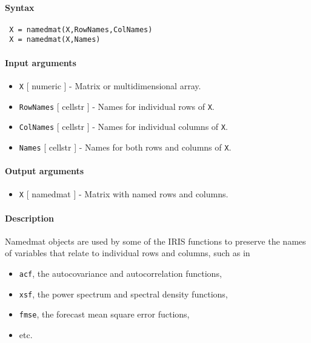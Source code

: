 


	\paragraph{Syntax}
 
 \begin{verbatim}
 X = namedmat(X,RowNames,ColNames)
 X = namedmat(X,Names)
 \end{verbatim}
 
 \paragraph{Input arguments}
 
 \begin{itemize}
 \item
   \texttt{X} {[} numeric {]} - Matrix or multidimensional array.
 \item
   \texttt{RowNames} {[} cellstr {]} - Names for individual rows of
   \texttt{X}.
 \item
   \texttt{ColNames} {[} cellstr {]} - Names for individual columns of
   \texttt{X}.
 \item
   \texttt{Names} {[} cellstr {]} - Names for both rows and columns of
   \texttt{X}.
 \end{itemize}
 
 \paragraph{Output arguments}
 
 \begin{itemize}
 \item
   \texttt{X} {[} namedmat {]} - Matrix with named rows and columns.
 \end{itemize}
 
 \paragraph{Description}
 
 Namedmat objects are used by some of the IRIS functions to preserve the
 names of variables that relate to individual rows and columns, such as
 in
 
 \begin{itemize}
 \item
   \texttt{acf}, the autocovariance and autocorrelation functions,
 \item
   \texttt{xsf}, the power spectrum and spectral density functions,
 \item
   \texttt{fmse}, the forecast mean square error fuctions,
 \item
   etc.
 \end{itemize}
 
